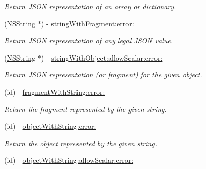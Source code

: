 \begin{DoxyCompactItemize}
\begin{DoxyCompactList}\small\item\em \-Return \-J\-S\-O\-N representation of an array or dictionary. \end{DoxyCompactList}\item 
\hypertarget{interface_s_b_j_s_o_n_a006d605894edce824a18ec157ec28a3e}{
(\hyperlink{class_n_s_string}{\-N\-S\-String} $\ast$) -\/ \hyperlink{interface_s_b_j_s_o_n_a006d605894edce824a18ec157ec28a3e}{string\-With\-Fragment\-:error\-:}}
\label{interface_s_b_j_s_o_n_a006d605894edce824a18ec157ec28a3e}

\begin{DoxyCompactList}\small\item\em \-Return \-J\-S\-O\-N representation of any legal \-J\-S\-O\-N value. \end{DoxyCompactList}\item 
\hypertarget{interface_s_b_j_s_o_n_a1daa6e2cb4bac21afe6c884ece6dc4ad}{
(\hyperlink{class_n_s_string}{\-N\-S\-String} $\ast$) -\/ \hyperlink{interface_s_b_j_s_o_n_a1daa6e2cb4bac21afe6c884ece6dc4ad}{string\-With\-Object\-:allow\-Scalar\-:error\-:}}
\label{interface_s_b_j_s_o_n_a1daa6e2cb4bac21afe6c884ece6dc4ad}

\begin{DoxyCompactList}\small\item\em \-Return \-J\-S\-O\-N representation (or fragment) for the given object. \end{DoxyCompactList}\item 
\hypertarget{interface_s_b_j_s_o_n_aa88f7cb9ddc4ab7fd6e9fc0853e6da6a}{
(id) -\/ \hyperlink{interface_s_b_j_s_o_n_aa88f7cb9ddc4ab7fd6e9fc0853e6da6a}{fragment\-With\-String\-:error\-:}}
\label{interface_s_b_j_s_o_n_aa88f7cb9ddc4ab7fd6e9fc0853e6da6a}

\begin{DoxyCompactList}\small\item\em \-Return the fragment represented by the given string. \end{DoxyCompactList}\item 
\hypertarget{interface_s_b_j_s_o_n_a2b0ae389a765270663c1e1110bcef613}{
(id) -\/ \hyperlink{interface_s_b_j_s_o_n_a2b0ae389a765270663c1e1110bcef613}{object\-With\-String\-:error\-:}}
\label{interface_s_b_j_s_o_n_a2b0ae389a765270663c1e1110bcef613}

\begin{DoxyCompactList}\small\item\em \-Return the object represented by the given string. \end{DoxyCompactList}\item 
\hypertarget{interface_s_b_j_s_o_n_a942831fa293980ad189b72860055d32a}{
(id) -\/ \hyperlink{interface_s_b_j_s_o_n_a942831fa293980ad189b72860055d32a}{object\-With\-String\-:allow\-Scalar\-:error\-:}}
\label{interface_s_b_j_s_o_n_a942831fa293980ad189b72860055d32a}


\end{DoxyCompactItemize}
